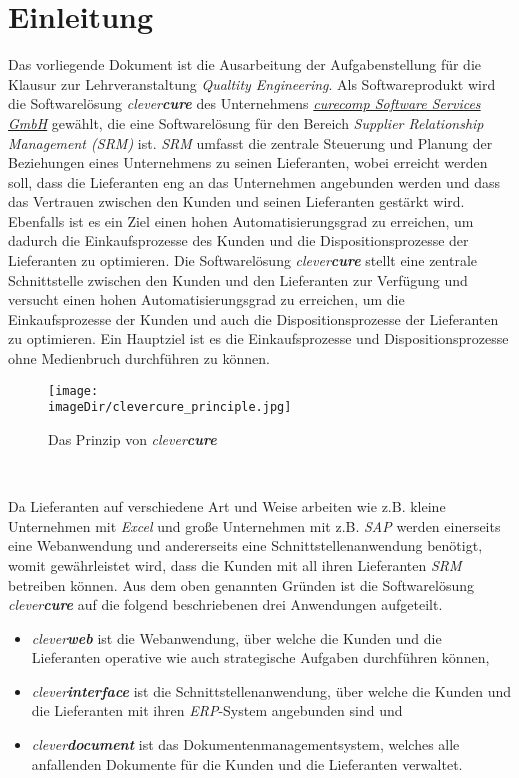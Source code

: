 \section{Einleitung}
\label{sec:einleitung}
Das vorliegende Dokument ist die Ausarbeitung der Aufgabenstellung für die Klausur zur Lehrveranstaltung \emph{Qualtity Engineering}. Als Softwareprodukt wird die Softwarelösung \emph{clever\textbf{cure}} des Unternehmens \hyperlink{http://www.curecomp.com/}{\emph{curecomp Software Services GmbH}} gewählt, die eine Softwarelösung für den Bereich \emph{Supplier Relationship Management (SRM)} ist. 
\newline
\newline
\emph{SRM} umfasst die zentrale Steuerung und Planung der Beziehungen eines Unternehmens zu seinen Lieferanten, wobei erreicht werden soll, dass die Lieferanten eng an das Unternehmen angebunden werden und dass das Vertrauen zwischen den Kunden und seinen Lieferanten gestärkt wird. Ebenfalls ist es ein Ziel einen hohen Automatisierungsgrad zu erreichen, um dadurch die Einkaufsprozesse des Kunden und die Dispositionsprozesse der Lieferanten zu optimieren.  
\newline
\newline
Die Softwarelösung \emph{clever\textbf{cure}} stellt eine zentrale Schnittstelle zwischen den Kunden und den Lieferanten zur Verfügung und versucht einen hohen Automatisierungsgrad zu erreichen, um die Einkaufsprozesse der Kunden und auch die Dispositionsprozesse der Lieferanten zu optimieren. Ein Hauptziel ist es die Einkaufsprozesse und Dispositionsprozesse ohne Medienbruch durchführen zu können.

\begin{figure}[h]
	\centering
	\texttt{[image: \\imageDir/clevercure\_principle.jpg]}
	\caption{Das Prinzip von \emph{clever\textbf{cure}}}
	\label{fig:clevercure-principle}
\end{figure}
\ \newpage

Da Lieferanten auf verschiedene Art und Weise arbeiten wie z.B. kleine Unternehmen mit \emph{Excel} und große Unternehmen mit z.B. \emph{SAP} werden einerseits eine Webanwendung und andererseits eine Schnittstellenanwendung benötigt, womit gewährleistet wird, dass die Kunden mit all ihren Lieferanten \emph{SRM} betreiben können.
\newline
\newline  
Aus dem oben genannten Gründen ist die Softwarelösung \emph{clever\textbf{cure}} auf die folgend beschriebenen drei Anwendungen aufgeteilt.
\begin{itemize}
	\item\emph{clever\textbf{web}} ist die Webanwendung, über welche die Kunden und die Lieferanten operative wie auch strategische Aufgaben durchführen können,
	\item\emph{clever\textbf{interface}} ist die Schnittstellenanwendung, über welche die Kunden und die Lieferanten mit ihren \emph{ERP}-System angebunden sind und
	\item\emph{clever\textbf{document}} ist das Dokumentenmanagementsystem, welches alle anfallenden Dokumente für die Kunden und die Lieferanten verwaltet. 
\end{itemize}

